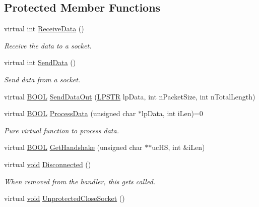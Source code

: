 \subsection*{\-Protected \-Member \-Functions}
\begin{DoxyCompactItemize}
\item 
virtual int \hyperlink{class_c_p_connection_a51cab90d3e5f74d43a838e4ed5fe9c89}{\-Receive\-Data} ()
\begin{DoxyCompactList}\small\item\em \-Receive the data to a socket. \end{DoxyCompactList}\item 
virtual int \hyperlink{class_c_p_connection_a7678a5c828e5bc52dd0619821904bcac}{\-Send\-Data} ()
\begin{DoxyCompactList}\small\item\em \-Send data from a socket. \end{DoxyCompactList}\item 
virtual \hyperlink{_cpclient_8h_a3be13892ae7076009afcf121347dd319}{\-B\-O\-O\-L} \hyperlink{class_c_p_connection_a502e914917ea8c82f2225253d1bd0a71}{\-Send\-Data\-Out} (\hyperlink{_x_plat_8h_ad162cb9da5f09788c88e33cd9486a158}{\-L\-P\-S\-T\-R} lp\-Data, int n\-Packet\-Size, int n\-Total\-Length)
\item 
virtual \hyperlink{_cpclient_8h_a3be13892ae7076009afcf121347dd319}{\-B\-O\-O\-L} \hyperlink{class_c_p_connection_a1b223eab8f518f390b2c01f7c1e33e72}{\-Process\-Data} (unsigned char $\ast$lp\-Data, int i\-Len)=0
\begin{DoxyCompactList}\small\item\em \-Pure virtual function to process data. \end{DoxyCompactList}\item 
virtual \hyperlink{_cpclient_8h_a3be13892ae7076009afcf121347dd319}{\-B\-O\-O\-L} \hyperlink{class_c_p_connection_a9793183adddb29f39186eee5eac6701f}{\-Get\-Handshake} (unsigned char $\ast$$\ast$uc\-H\-S, int \&i\-Len)
\item 
virtual \hyperlink{_cpclient_8h_a6464f7480a0fd0ee170cba12b2c0497f}{void} \hyperlink{class_c_p_connection_a331c50e83d37b88ac099aa95b6b1523c}{\-Disconnected} ()
\begin{DoxyCompactList}\small\item\em \-When removed from the handler, this gets called. \end{DoxyCompactList}\item 
virtual \hyperlink{_cpclient_8h_a6464f7480a0fd0ee170cba12b2c0497f}{void} \hyperlink{class_c_p_connection_a5c83da25150fd43d9fe4522d34d6cffb}{\-Unprotected\-Close\-Socket} ()
$$
\end{DoxyCompactItemize}
